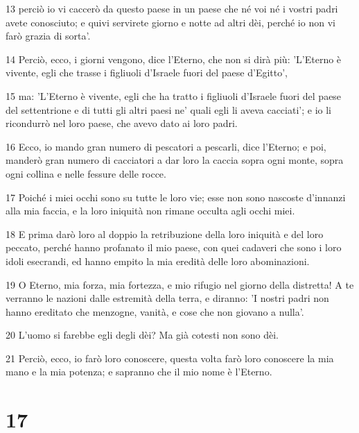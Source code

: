 \par 13 perciò io vi caccerò da questo paese in un paese che né voi né i vostri padri avete conosciuto; e quivi servirete giorno e notte ad altri dèi, perché io non vi farò grazia di sorta'.
\par 14 Perciò, ecco, i giorni vengono, dice l'Eterno, che non si dirà più: 'L'Eterno è vivente, egli che trasse i figliuoli d'Israele fuori del paese d'Egitto',
\par 15 ma: 'L'Eterno è vivente, egli che ha tratto i figliuoli d'Israele fuori del paese del settentrione e di tutti gli altri paesi ne' quali egli li aveva cacciati'; e io li ricondurrò nel loro paese, che avevo dato ai loro padri.
\par 16 Ecco, io mando gran numero di pescatori a pescarli, dice l'Eterno; e poi, manderò gran numero di cacciatori a dar loro la caccia sopra ogni monte, sopra ogni collina e nelle fessure delle rocce.
\par 17 Poiché i miei occhi sono su tutte le loro vie; esse non sono nascoste d'innanzi alla mia faccia, e la loro iniquità non rimane occulta agli occhi miei.
\par 18 E prima darò loro al doppio la retribuzione della loro iniquità e del loro peccato, perché hanno profanato il mio paese, con quei cadaveri che sono i loro idoli esecrandi, ed hanno empito la mia eredità delle loro abominazioni.
\par 19 O Eterno, mia forza, mia fortezza, e mio rifugio nel giorno della distretta! A te verranno le nazioni dalle estremità della terra, e diranno: 'I nostri padri non hanno ereditato che menzogne, vanità, e cose che non giovano a nulla'.
\par 20 L'uomo si farebbe egli degli dèi? Ma già cotesti non sono dèi.
\par 21 Perciò, ecco, io farò loro conoscere, questa volta farò loro conoscere la mia mano e la mia potenza; e sapranno che il mio nome è l'Eterno.

\chapter{17}

